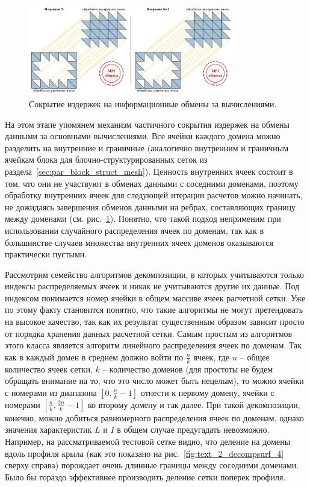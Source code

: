\begin{figure}[ht]
\centering
\includegraphics[width=0.8\textwidth]{fig/par_mpi_border_inner.pdf}
\singlespacing
{}\caption{Сокрытие издержек на информационные обмены за вычислениями.}
\label{fig:text_2_decompsurf_wing_border_inner}
\end{figure}

На этом этапе упомянем механизм частичного сокрытия издержек на обмены данными за основными вычислениями.
Все ячейки каждого домена можно разделить на внутренние и граничные (аналогично внутренним и граничным ячейкам блока для блочно-структурированных сеток из раздела~\ref{sec:par_block_struct_mesh}).
Ценность внутренних ячеек состоит в том, что они не участвуют в обменах данными с соседними доменами, поэтому обработку внутренних ячеек для следующей итерации расчетов можно начинать, не дожидаясь завершения обменов данными на ребрах, составляющих границу между доменами (см. рис.~\ref{fig:text_2_decompsurf_wing_border_inner}).
Понятно, что такой подход неприменим при использовании случайного распределения ячеек по доменам, так как в большинстве случаев множества внутренних ячеек доменов оказываются практически пустыми.

Рассмотрим семейство алгоритмов декомпозиции, в которых учитываются только индексы распределяемых ячеек и никак не учитываются другие их данные.
Под индексом понимается номер ячейки в общем массиве ячеек расчетной сетки.
Уже по этому факту становится понятно, что такие алгоритмы не могут претендовать на высокое качество, так как их результат существенным образом зависит просто от порядка хранения данных расчетной сетки.
Самым простым из алгоритмов этого класса является алгоритм линейного распределения ячеек по доменам.
Так как в каждый домен в среднем должно войти по $\frac{n}{k}$ ячеек, где $n$ -- общее количество ячеек сетки, $k$ -- количество доменов (для простоты не будем обращать внимание на то, что это число может быть нецелым), то можно ячейки с номерами из диапазона $[0, \frac{n}{k} - 1]$ отнести к первому домену, ячейки с номерами $[\frac{n}{k}, \frac{2n}{k} - 1]$ ко второму домену и так далее.
При такой декомпозиции, конечно, можно добиться равномерного распределения ячеек по доменам, однако значения характеристик $L$ и $I$ в общем случае предугадать невозможно.
Например, на рассматриваемой тестовой сетке видно, что деление на домены вдоль профиля крыла (как это показано на рис.~\ref{fig:text_2_decompsurf_4} сверху справа) порождает очень длинные границы между соседними доменами.
Было бы гораздо эффективнее производить деление сетки поперек профиля.

